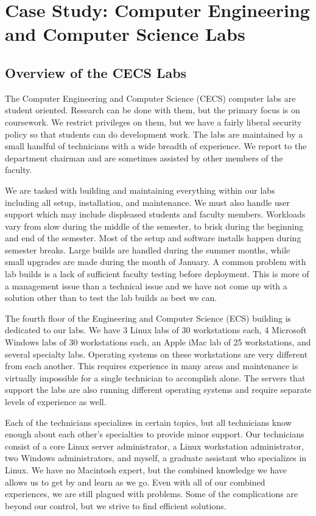 \chapter{Case Study:  Computer Engineering and Computer Science Labs} \label{ch:introduction_case_study}
\section{Overview of the CECS Labs}

The Computer Engineering and Computer Science (CECS) computer labs are student oriented.  Research can be done with them, but the primary focus is on coursework.  We restrict privileges on them, but we have a fairly liberal security policy so that students can do development work.  The labs are maintained by a small handful of technicians with a wide breadth of experience.  We report to the department chairman and are sometimes assisted by other members of the faculty. 

We are tasked with building and maintaining everything within our labs including all setup, installation, and maintenance.  We must also handle user support which may include displeased students and faculty members.  Workloads vary from slow during the middle of the semester, to brisk during the beginning and end of the semester.  Most of the setup and software installs happen during semester breaks.  Large builds are handled during the summer months, while small upgrades are made during the month of January.  A common problem with lab builds is a lack of sufficient faculty testing before deployment.  This is more of a management issue than a technical issue and we have not come up with a solution other than to test the lab builds as best we can. 

The fourth floor of the Engineering and Computer Science (ECS) building is dedicated to our labs.  We have 3 Linux labs of 30 workstations each, 4 Microsoft Windows labs of 30 workstations each, an Apple iMac lab of 25 workstations, and several specialty labs.  Operating systems on these workstations are very different from each another.  This requires experience in many areas and maintenance is virtually impossible for a single technician to accomplish alone.  The servers that support the labs are also running different operating systems and require separate levels of experience as well.

Each of the technicians specializes in certain topics, but all technicians know enough about each other’s specialties to provide minor support.  Our technicians consist of a core Linux server administrator, a Linux workstation administrator, two Windows administrators, and myself, a graduate assistant who specializes in Linux.  We have no Macintosh expert, but the combined knowledge we have allows us to get by and learn as we go.  Even with all of our combined experiences, we are still plagued with problems.  Some of the complications are beyond our control, but we strive to find efficient solutions. 

